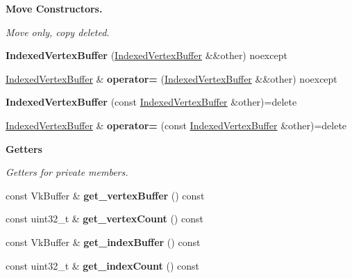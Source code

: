 \begin{Indent}\textbf{ Move Constructors.}\par
{\em Move only, copy deleted. }\begin{DoxyCompactItemize}
\item 
\mbox{\label{classblaze_1_1IndexedVertexBuffer_af56d16583d47369fad6144dcc61da588}} 
{\bfseries Indexed\+Vertex\+Buffer} (\hyperlink{classblaze_1_1IndexedVertexBuffer}{Indexed\+Vertex\+Buffer} \&\&other) noexcept
\item 
\mbox{\label{classblaze_1_1IndexedVertexBuffer_a579dff38ef6e80ea87993368addbc12c}} 
\hyperlink{classblaze_1_1IndexedVertexBuffer}{Indexed\+Vertex\+Buffer} \& {\bfseries operator=} (\hyperlink{classblaze_1_1IndexedVertexBuffer}{Indexed\+Vertex\+Buffer} \&\&other) noexcept
\item 
\mbox{\label{classblaze_1_1IndexedVertexBuffer_a1e6fe510baa1104bed9ccb65012dd85a}} 
{\bfseries Indexed\+Vertex\+Buffer} (const \hyperlink{classblaze_1_1IndexedVertexBuffer}{Indexed\+Vertex\+Buffer} \&other)=delete
\item 
\mbox{\label{classblaze_1_1IndexedVertexBuffer_a522c856cadfb78ae03c48e33f681fbb0}} 
\hyperlink{classblaze_1_1IndexedVertexBuffer}{Indexed\+Vertex\+Buffer} \& {\bfseries operator=} (const \hyperlink{classblaze_1_1IndexedVertexBuffer}{Indexed\+Vertex\+Buffer} \&other)=delete
\end{DoxyCompactItemize}
\end{Indent}
\begin{Indent}\textbf{ Getters}\par
{\em Getters for private members. }\begin{DoxyCompactItemize}
\item 
\mbox{\label{classblaze_1_1IndexedVertexBuffer_a74a061c710de2b0c083dadfb0e63d031}} 
const Vk\+Buffer \& {\bfseries get\+\_\+vertex\+Buffer} () const
\item 
\mbox{\label{classblaze_1_1IndexedVertexBuffer_a5c4db620c39e5c2fbad56450c6ab794e}} 
const uint32\+\_\+t \& {\bfseries get\+\_\+vertex\+Count} () const
\item 
\mbox{\label{classblaze_1_1IndexedVertexBuffer_ad8fe034fbb2c0c3cb4a795d8d411048c}} 
const Vk\+Buffer \& {\bfseries get\+\_\+index\+Buffer} () const
\item 
\mbox{\label{classblaze_1_1IndexedVertexBuffer_a39e0c59b6111be2b49b69eb333a65d49}} 
const uint32\+\_\+t \& {\bfseries get\+\_\+index\+Count} () const
\end{DoxyCompactItemize}
\end{Indent}


